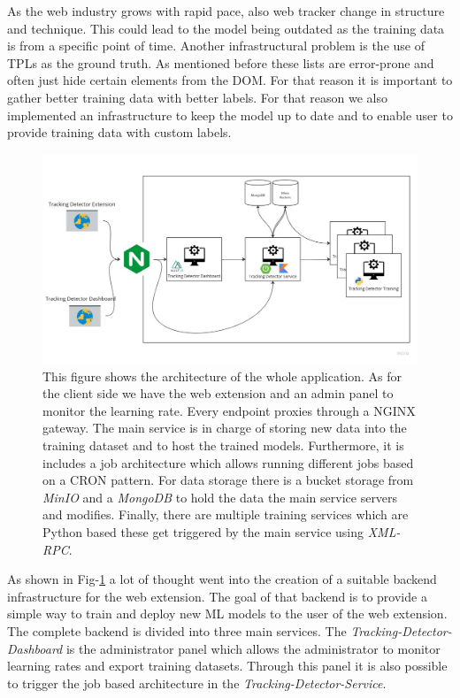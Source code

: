 As the web industry grows with rapid pace, also web tracker change in structure and technique. This could lead to the model being 
outdated as the training data is from a specific point of time. Another infrastructural problem is the use of TPLs as the ground truth. As mentioned
before these lists are error-prone and often just hide certain elements from the DOM. For that reason it is important to gather better 
training data with better labels. For that reason we also implemented an infrastructure to keep the model up to date and to enable user to
provide training data with custom labels.
\begin{figure}
  \begin{center}
    \includegraphics[width=1\textwidth]{images/TrackingDetectorInfra.jpg}
  \end{center}
  \caption{This figure shows the architecture of the whole application. As for the client side we have the web extension and an admin panel to 
  monitor the learning rate. Every endpoint proxies through a NGINX gateway. The main service is in charge of storing new data into the training dataset and 
  to host the trained models. Furthermore, it is includes a job architecture which allows running different jobs based on a CRON pattern. For data storage there is 
  a bucket storage from \emph{MinIO} and a \emph{MongoDB} to hold the data the main service servers and modifies. Finally, there are multiple training services which are Python based
  these get triggered by the main service using \emph{XML-RPC}.
  }
  \label{fig:tdInfra}
\end{figure}

As shown in Fig-\ref{fig:tdInfra} a lot of thought went into the creation of a suitable backend infrastructure for the web extension. The goal of that
backend is to provide a simple way to train and deploy new ML models to the user of the web extension. The complete backend is divided into
three main services. The \emph{Tracking-Detector-Dashboard} is the administrator panel which allows the administrator to monitor learning rates and export 
training datasets. Through this panel it is also possible to trigger the job based architecture in the \emph{Tracking-Detector-Service}.

